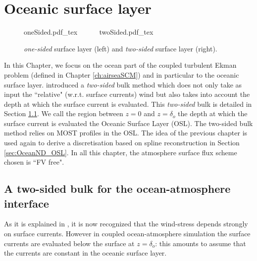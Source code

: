 \chapter{Oceanic surface layer}
\label{ch:OceanND}
\minitoc
\begin{figure}
	\centering
	{oneSided.pdf_tex}
	~~~~~
	{twoSided.pdf_tex}
	\caption{\textit{one-sided} surface layer
	(left) and \textit{two-sided} surface layer (right).}
	\label{fig:OceanND_twoSidedBulk_drawing}
\end{figure}
In this Chapter, we focus on the ocean part of the coupled turbulent
Ekman problem (defined in Chapter \ref{ch:airseaSCM})
and in particular to the oceanic surface layer.
\citep{pelletier_two-sided_2021} introduced a \textit{two-sided}
bulk method which does not only take as input
the ``relative" (w.r.t. surface currents) wind but also takes into
account the depth at which the surface current is evaluated.
This \textit{two-sided} bulk is detailed in Section
\ref{sec:OceanND_twoSidedBulk}.
We call the region between $z=0$ and
$z=\delta_o$ the depth at which the surface current is evaluated
the Oceanic Surface Layer (OSL).
The two-sided bulk method relies on MOST profiles in the OSL.
The idea of the previous chapter is used again to
derive a discretisation based on spline reconstruction
in Section \ref{sec:OceanND_OSL}.
In all this chapter, the atmosphere surface flux scheme chosen
is ``FV free".
\section{A two-sided bulk for the ocean-atmosphere interface}
\label{sec:OceanND_twoSidedBulk}
As it is explained in \citep{pelletier_two-sided_2021}, it is now
recognized that the wind-stress depends strongly on surface currents. 
However in coupled ocean-atmosphere simulation
the surface currents are evaluated below the surface at $z=\delta_o$:
this amounts to assume that the currents are constant in the
oceanic surface layer.

